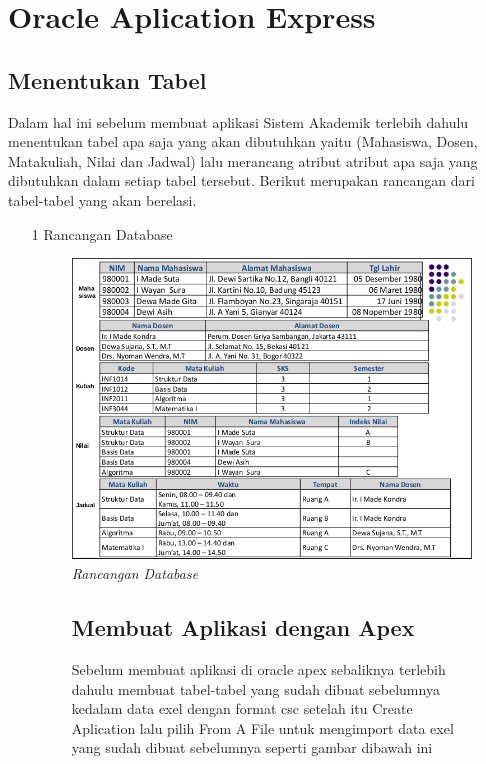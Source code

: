 \chapter{Oracle Aplication Express}


\section{Menentukan Tabel}
Dalam hal ini sebelum membuat aplikasi Sistem Akademik terlebih dahulu menentukan 
tabel apa saja yang akan dibutuhkan yaitu (Mahasiswa, Dosen, Matakuliah, Nilai dan Jadwal) lalu
merancang atribut atribut apa saja yang dibutuhkan dalam setiap tabel tersebut. Berikut merupakan rancangan 
dari tabel-tabel yang akan berelasi.
\begin{enumerate}
\item[1]Rancangan Database

\begin{figure}[!htbp]

    \begin{center}
        \includegraphics[scale=0.6]{figures/tabelMhs.png}
        \caption{\textit{Rancangan Database}}
        \end{center}   
        \end{figure}
        \begin{figure}[!htbp]

    \section{Membuat Aplikasi dengan Apex}
    Sebelum membuat aplikasi di oracle apex sebaliknya terlebih dahulu
    membuat tabel-tabel yang sudah dibuat sebelumnya kedalam data exel dengan format csc
    setelah itu Create Aplication lalu pilih From A File untuk mengimport data exel yang sudah
    dibuat sebelumnya seperti gambar dibawah ini



\end{figure}
\end{enumerate}

